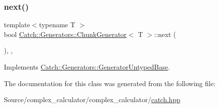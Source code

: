 \mbox{\label{class_catch_1_1_generators_1_1_chunk_generator_a545e89f80eb1e3c953491541ea083f86}} 
\subsubsection{\texorpdfstring{next()}{next()}}
{\footnotesize\ttfamily template$<$typename T $>$ \\
bool \mbox{\hyperlink{class_catch_1_1_generators_1_1_chunk_generator}{Catch\+::\+Generators\+::\+Chunk\+Generator}}$<$ T $>$\+::next (\begin{DoxyParamCaption}{ }\end{DoxyParamCaption})\hspace{0.3cm}{\ttfamily [inline]}, {\ttfamily [override]}, {\ttfamily [virtual]}}



Implements \mbox{\hyperlink{class_catch_1_1_generators_1_1_generator_untyped_base_aeed3c0cd6233c5f553549e453b8d6638}{Catch\+::\+Generators\+::\+Generator\+Untyped\+Base}}.



The documentation for this class was generated from the following file\+:\begin{DoxyCompactItemize}
\item 
Source/complex\+\_\+calculator/complex\+\_\+calculator/\mbox{\hyperlink{catch_8hpp}{catch.\+hpp}}\end{DoxyCompactItemize}
